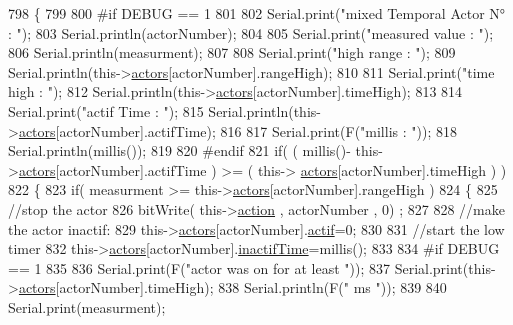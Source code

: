 \begin{DoxyCode}
798 \{
799 
800 \textcolor{preprocessor}{#if DEBUG == 1}
801     
802     Serial.print(\textcolor{stringliteral}{"mixed Temporal Actor N° : "});
803     Serial.println(actorNumber);
804 
805     Serial.print(\textcolor{stringliteral}{"measured value : "});
806     Serial.println(measurment);
807 
808     Serial.print(\textcolor{stringliteral}{"high range : "});
809     Serial.println(this->\hyperlink{class_jetpack_a7e16d2f97837f9712a2e6de1c50d99db}{actors}[actorNumber].rangeHigh);
810 
811     Serial.print(\textcolor{stringliteral}{"time high : "});
812     Serial.println(this->\hyperlink{class_jetpack_a7e16d2f97837f9712a2e6de1c50d99db}{actors}[actorNumber].timeHigh);
813 
814     Serial.print(\textcolor{stringliteral}{"actif Time : "});
815     Serial.println(this->\hyperlink{class_jetpack_a7e16d2f97837f9712a2e6de1c50d99db}{actors}[actorNumber].actifTime);
816 
817     Serial.print(F(\textcolor{stringliteral}{"millis : "}));
818     Serial.println(millis());
819 
820 \textcolor{preprocessor}{#endif}
821     \textcolor{keywordflow}{if}( ( millis()- this->\hyperlink{class_jetpack_a7e16d2f97837f9712a2e6de1c50d99db}{actors}[actorNumber].actifTime  ) >= (  this->
      \hyperlink{class_jetpack_a7e16d2f97837f9712a2e6de1c50d99db}{actors}[actorNumber].timeHigh  ) )
822     \{   
823         \textcolor{keywordflow}{if}( measurment >= this->\hyperlink{class_jetpack_a7e16d2f97837f9712a2e6de1c50d99db}{actors}[actorNumber].rangeHigh )
824         \{
825             \textcolor{comment}{//stop the actor}
826             bitWrite( this->\hyperlink{class_jetpack_aca3142925a7b0834b34ae91d26af7765}{action} , actorNumber , 0) ;
827 
828             \textcolor{comment}{//make the actor inactif:}
829             this->\hyperlink{class_jetpack_a7e16d2f97837f9712a2e6de1c50d99db}{actors}[actorNumber].\hyperlink{struct_jetpack_1_1state_aa177541689bbaea21a4650a083b0df77}{actif}=0;
830 
831             \textcolor{comment}{//start the low timer}
832             this->\hyperlink{class_jetpack_a7e16d2f97837f9712a2e6de1c50d99db}{actors}[actorNumber].\hyperlink{struct_jetpack_1_1state_aaf817b1f9e7a4d65b9e3ca4726b281f6}{inactifTime}=millis();
833 
834 \textcolor{preprocessor}{        #if DEBUG == 1 }
835 
836             Serial.print(F(\textcolor{stringliteral}{"actor was on for at least "}));
837             Serial.print(this->\hyperlink{class_jetpack_a7e16d2f97837f9712a2e6de1c50d99db}{actors}[actorNumber].timeHigh);
838             Serial.println(F(\textcolor{stringliteral}{" ms "}));
839 
840             Serial.print(measurment);

\end{DoxyCode}
